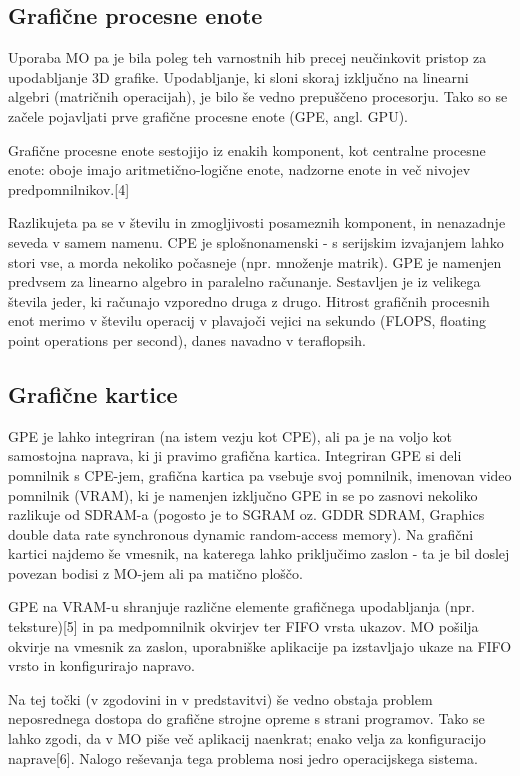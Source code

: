 \documentclass{article}
\begin{document}
\subsection{Grafične procesne enote}
Uporaba MO pa je bila poleg teh varnostnih hib precej neučinkovit pristop za upodabljanje 3D grafike. Upodabljanje, ki sloni skoraj izključno na linearni algebri (matričnih operacijah), je bilo še vedno prepuščeno procesorju. Tako so se začele pojavljati prve grafične procesne enote (GPE, angl. GPU).

Grafične procesne enote sestojijo iz enakih komponent, kot centralne procesne enote: oboje imajo aritmetično-logične enote, nadzorne enote in več nivojev predpomnilnikov.[4]

Razlikujeta pa se v številu in zmogljivosti posameznih komponent, in nenazadnje seveda v samem namenu. CPE je splošnonamenski - s serijskim izvajanjem lahko stori vse, a morda nekoliko počasneje (npr. množenje matrik). GPE je namenjen predvsem za linearno algebro in paralelno računanje. Sestavljen je iz velikega števila jeder, ki računajo vzporedno druga z drugo. Hitrost grafičnih procesnih enot merimo v številu operacij v plavajoči vejici na sekundo (FLOPS, floating point operations per second), danes navadno v teraflopsih.

\subsection{Grafične kartice}
GPE je lahko integriran (na istem vezju kot CPE), ali pa je na voljo kot samostojna naprava, ki ji pravimo grafična kartica. Integriran GPE si deli pomnilnik s CPE-jem, grafična kartica pa vsebuje svoj pomnilnik, imenovan video pomnilnik (VRAM), ki je namenjen izključno GPE in se po zasnovi nekoliko razlikuje od SDRAM-a (pogosto je to SGRAM oz. GDDR SDRAM, Graphics double data rate synchronous dynamic random-access memory). Na grafični kartici najdemo še vmesnik, na katerega lahko priključimo zaslon - ta je bil doslej povezan bodisi z MO-jem ali pa matično ploščo.

GPE na VRAM-u shranjuje različne elemente grafičnega upodabljanja (npr. teksture)[5] in pa medpomnilnik okvirjev ter FIFO vrsta ukazov. MO pošilja okvirje na vmesnik za zaslon, uporabniške aplikacije pa izstavljajo ukaze na FIFO vrsto in konfigurirajo napravo.

Na tej točki (v zgodovini in v predstavitvi) še vedno obstaja problem neposrednega dostopa do grafične strojne opreme s strani programov. Tako se lahko zgodi, da v MO piše več aplikacij naenkrat; enako velja za konfiguracijo naprave[6]. Nalogo reševanja tega problema nosi jedro operacijskega sistema.
\end{document}
